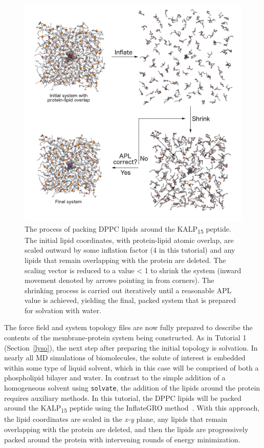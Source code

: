\documentclass[9pt,tutorial]{livecoms}
\begin{document}
\begin{figure}[h!]
\centering
\includegraphics{kalp_dppc_lipid_pack}
\caption{The process of packing DPPC lipids around the KALP\textsubscript{15} peptide. The initial lipid coordinates, with protein-lipid atomic overlap, are scaled outward by some inflation factor (4 in this tutorial) and any lipids that remain overlapping with the protein are deleted. The scaling vector is reduced to a value < 1 to shrink the system (inward movement denoted by arrows pointing in from corners). The shrinking process is carried out iteratively until a reasonable APL value is achieved, yielding the final, packed system that is prepared for solvation with water.}
\label{kalp_lipid_pack}
\end{figure}

The force field and system topology files are now fully prepared to describe the contents of the membrane-protein system being constructed. As in Tutorial 1 (Section~\ref{lyso}), the next step after preparing the initial topology is solvation. In nearly all MD simulations of biomolecules, the solute of interest is embedded within some type of liquid solvent, which in this case will be comprised of both a phospholipid bilayer and water. In contrast to the simple addition of a homogeneous solvent using \texttt{solvate}, the addition of the lipids around the protein requires auxiliary methods. In this tutorial, the DPPC lipids will be packed around the KALP\textsubscript{15} peptide using the InflateGRO method~\cite{Kandt2007}. With this approach, the lipid coordinates are scaled in the {\em x-y} plane, any lipids that remain overlapping with the protein are deleted, and then the lipids are progressively packed around the protein with intervening rounds of energy minimization.
\end{document}
